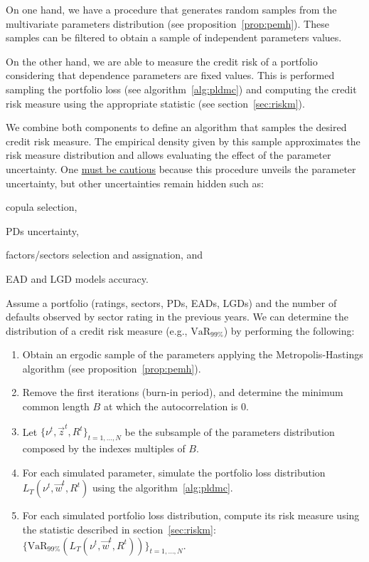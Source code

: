 \documentclass[11pt,fleqn]{book} %
\begin{document}
On one hand, we have a procedure that generates random samples from the 
multivariate parameters distribution (see proposition~\ref{prop:pemh}).
These samples can be filtered to obtain a sample of independent parameters 
values.

On the other hand, we are able to measure the credit risk of a portfolio 
considering that dependence parameters are fixed values. This is performed 
sampling the portfolio loss (see algorithm~\ref{alg:pldmc}) and computing 
the credit risk measure using the appropriate statistic (see 
section~\ref{sec:riskm}).

We combine both components to define an algorithm that samples the desired
credit risk measure. The empirical density given by this sample 
approximates the risk measure distribution and allows evaluating the 
effect of the parameter uncertainty. One \ul{must be cautious} because this 
procedure unveils the parameter uncertainty, but other uncertainties remain 
hidden such as:
\begin{inparaenum}[1)]
	\item copula selection, 
	\item PDs uncertainty,
	\item factors/sectors selection and assignation, and
	\item EAD and LGD models accuracy.
\end{inparaenum}

\begin{algorithm}
	\label{alg:crmd}
	Assume a portfolio (ratings, sectors, PDs, EADs, LGDs) and the number 
	of defaults observed by sector rating in the previous years. We can
	determine the distribution of a credit risk measure 
	(e.g., $\text{VaR}_{99\%}$) by performing the following:
	\begin{enumerate}
		\item Obtain an ergodic sample of the parameters applying the
		Metropolis-Hastings algorithm (see proposition~\ref{prop:pemh}).
		\item Remove the first iterations (burn-in period), and determine
		the minimum common length $B$ at which the autocorrelation is $0$.
		\item Let $\{\nu^t, \vec{z}^t, R^t\}_{t=1,\dots,N}$ be the subsample
		of the parameters distribution composed by the indexes multiples 
		of $B$.
		\item For each simulated parameter, simulate the portfolio loss 
		distribution $L_T(\nu^t,\vec{w}^t,R^t)$ using the algorithm~\ref{alg:pldmc}.
		\item For each simulated portfolio loss distribution, compute its 
		risk measure using the statistic described in section~\ref{sec:riskm}:
		$\{\text{VaR}_{99\%}(L_T(\nu^t,\vec{w}^t,R^t))\}_{t=1,\dots,N}$.
	\end{enumerate}
\end{algorithm}
\end{document}

